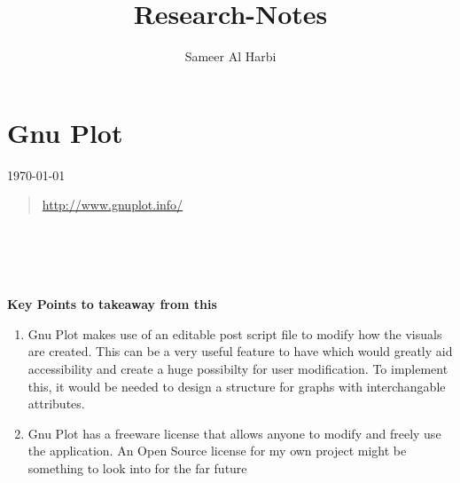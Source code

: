 \documentclass{paper}
\title{Research-Notes}
\author{Sameer Al Harbi}
\begin{document}
\part{Gnu Plot}
\today
\begin{quote}
\url{http://www.gnuplot.info/}
\end{quote}

\\
\\
\\
\\
\textbf{Key Points to takeaway from this}
\begin{enumerate}
    \item Gnu Plot makes use of an editable post script file to modify how the visuals are created. This can be a very useful feature to have which would greatly aid accessibility and create a huge possibilty for user modification. To implement this, it would be needed to design a structure for graphs with interchangable attributes. 
    \item Gnu Plot has a freeware license that allows anyone to modify and freely use the application. An Open Source license for my own project might be something to look into for the far future 
    
\end{enumerate}
\end{document}
